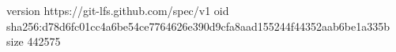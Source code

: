 version https://git-lfs.github.com/spec/v1
oid sha256:d78d6fc01cc4a6be54ce7764626e390d9cfa8aad155244f44352aab6be1a335b
size 442575
